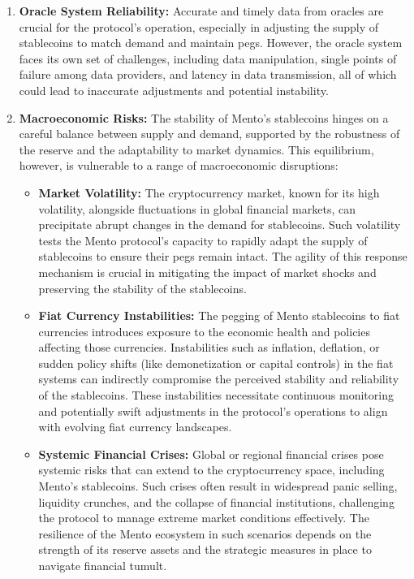 \documentclass[a4paper]{article}
\theoremstyle{definition}
\begin{document}
\begin{appendices}
\begin{enumerate}
    \item \textbf{Oracle System Reliability:} Accurate and timely data from oracles are crucial for the protocol's operation, especially in adjusting the supply of stablecoins to match demand and maintain pegs. However, the oracle system faces its own set of challenges, including data manipulation, single points of failure among data providers, and latency in data transmission, all of which could lead to inaccurate adjustments and potential instability.

    \item \textbf{Macroeconomic Risks:} 
    The stability of Mento's stablecoins hinges on a careful balance between supply and demand, supported by the robustness of the reserve and the adaptability to market dynamics. This equilibrium, however, is vulnerable to a range of macroeconomic disruptions:
    
    \begin{itemize}
        \item \textbf{Market Volatility:} The cryptocurrency market, known for its high volatility, alongside fluctuations in global financial markets, can precipitate abrupt changes in the demand for stablecoins. Such volatility tests the Mento protocol's capacity to rapidly adapt the supply of stablecoins to ensure their pegs remain intact. The agility of this response mechanism is crucial in mitigating the impact of market shocks and preserving the stability of the stablecoins.
    
        \item \textbf{Fiat Currency Instabilities:} The pegging of Mento stablecoins to fiat currencies introduces exposure to the economic health and policies affecting those currencies. Instabilities such as inflation, deflation, or sudden policy shifts (like demonetization or capital controls) in the fiat systems can indirectly compromise the perceived stability and reliability of the stablecoins. These instabilities necessitate continuous monitoring and potentially swift adjustments in the protocol's operations to align with evolving fiat currency landscapes.
    
        \item \textbf{Systemic Financial Crises:} Global or regional financial crises pose systemic risks that can extend to the cryptocurrency space, including Mento's stablecoins. Such crises often result in widespread panic selling, liquidity crunches, and the collapse of financial institutions, challenging the protocol to manage extreme market conditions effectively. The resilience of the Mento ecosystem in such scenarios depends on the strength of its reserve assets and the strategic measures in place to navigate financial tumult.
    

\end{itemize}
\end{enumerate}
\end{appendices}
\end{document}
